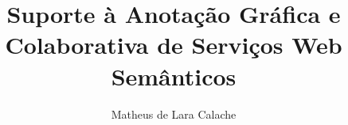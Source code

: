 \documentclass[
12pt,        %
openright,   %
twoside,     %
a4paper,     %
english,       %
brazil,        %
%
%
]{ppgca}
\title{Suporte à Anotação Gráfica e Colaborativa de Serviços Web Semânticos}
\author{Matheus de Lara Calache}
\begin{document}
%

\textual



\end{document}
